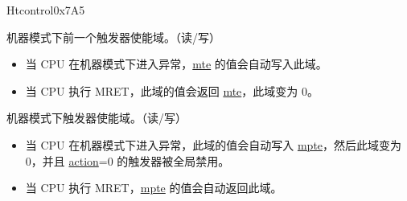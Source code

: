 \begin{register}{H}{tcontrol}{0x7A5}\label{regdesc:TCONTROL}
%
%
%
%
%
\regnewline%
\begin{regdesc}\begin{reglist}
\label{fielddesc:TCONTROLMPTE}\item [mpte] 机器模式下前一个触发器使能域。（读/写）
\begin{itemize}
    \setlength\itemsep{-1em}
    \item 当 CPU 在机器模式下进入异常，\hyperref[fielddesc:TCONTROLMTE]{mte} 的值会自动写入此域。
    \item 当 CPU 执行 MRET，此域的值会返回 \hyperref[fielddesc:TCONTROLMTE]{mte}，此域变为 0。
\end{itemize}
\label{fielddesc:TCONTROLMTE}\item [mte] 机器模式下触发器使能域。（读/写）
\begin{itemize}
    \setlength\itemsep{-1em}
    \item 当 CPU 在机器模式下进入异常，此域的值会自动写入 \hyperref[fielddesc:TCONTROLMPTE]{mpte}，然后此域变为 0，并且 \hyperref[fielddesc:MCONTROLACTION]{action}=0 的触发器被全局禁用。
    \item 当 CPU 执行 MRET，\hyperref[fielddesc:TCONTROLMPTE]{mpte} 的值会自动返回此域。
\end{itemize}
\end{reglist}\end{regdesc}
\end{register}

